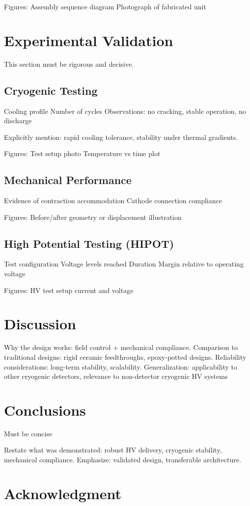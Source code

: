 \documentclass[a4paper,12pt]{article}
\begin{document}
Figures:
Assembly sequence diagram
Photograph of fabricated unit

\section{Experimental Validation}
\label{sec:val}
This section must be rigorous and decisive.

\subsection{Cryogenic Testing}
Cooling profile
Number of cycles
Observations: no cracking, stable operation, no discharge

Explicitly mention: rapid cooling tolerance, stability under thermal gradients.

Figures:
Test setup photo
Temperature vs time plot

\subsection{Mechanical Performance}
Evidence of contraction accommodation
Cathode connection compliance

Figures:
Before/after geometry or displacement illustration

\subsection{High Potential Testing (HIPOT)}
Test configuration
Voltage levels reached
Duration
Margin relative to operating voltage

Figures:
HV test setup
current and voltage 

\section{Discussion}
\label{sec:dis}
Why the design works: field control + mechanical compliance. 
Comparison to traditional designs: rigid ceramic feedthroughs, epoxy-potted designs.
Reliability considerations: long-term stability, scalability.
Generalization: applicability to other cryogenic detectors, relevance to non-detector cryogenic HV systems

\section{Conclusions}
\label{sec:con}
Must be concise

Restate what was demonstrated: robust HV delivery, cryogenic stability, mechanical compliance.
Emphasize: validated design, transferable architecture.


\section{Acknowledgment} 


\clearpage



\end{document}
